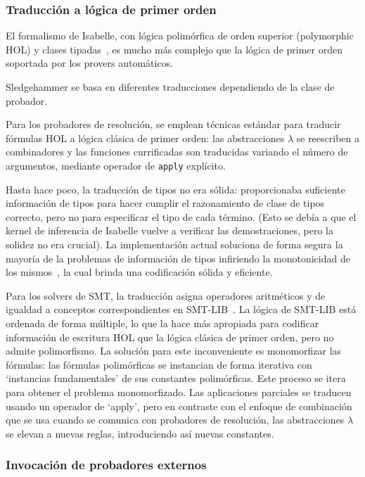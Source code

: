 \documentclass[12pt]{book}
\begin{document}
\subsubsection{Traducción a lógica de primer orden}

El formalismo de Isabelle, con lógica polimórfica de orden superior (polymorphic HOL) y clases tipadas~\cite{proof_processing_Isabelle}, es mucho más complejo que la lógica de primer orden soportada por los provers automáticos.

Sledgehammer se basa en diferentes traducciones dependiendo de la clase de probador.

Para los probadores de resolución, se emplean técnicas estándar para traducir fórmulas HOL a lógica clásica de primer orden: las abstracciones $\lambda$ se reescriben a combinadores y las funciones currificadas son traducidas variando el número de argumentos, mediante operador de \texttt{apply} explícito.

Hasta hace poco, la traducción de tipos no era sólida: proporcionaba suficiente información de tipos para hacer cumplir el razonamiento de clase de tipos correcto, pero no para especificar el tipo de cada término. (Esto se debía a que el kernel de inferencia de Isabelle vuelve a verificar las demostraciones, pero la solidez no era crucial). La implementación actual soluciona de forma segura la mayoría de la problemas de información de tipos infiriendo la monotonicidad de los mismos~\cite{monotonicity_inference_for_hol}, la cual brinda una codificación sólida y eficiente.

Para los solvers de SMT, la traducción asigna operadores aritméticos y de igualdad a conceptos correspondientes en SMT-LIB~\cite{SMT-LIB}. La lógica de SMT-LIB está ordenada de forma múltiple, lo que la hace más apropiada para codificar información de escritura HOL que la lógica clásica de primer orden, pero no admite polimorfismo. La solución para este inconveniente es monomorfizar las fórmulas: las fórmulas polimórficas se instancian de forma iterativa con `instancias fundamentales' de sus constantes polimórficas. Este proceso se itera para obtener el problema monomorfizado. Las aplicaciones parciales se traducen usando un operador de `apply', pero en contraste con el enfoque de combinación que se usa cuando se comunica con probadores de resolución, las abstracciones $\lambda$ se elevan a nuevas reglas, introduciendo así nuevas constantes.

\subsubsection{Invocación de probadores externos}
\end{document}
